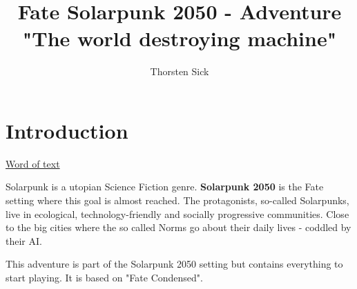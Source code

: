 \documentclass{book}
\title{Fate Solarpunk 2050 - Adventure "The world destroying machine"}
\author{Thorsten Sick}
\begin{document}
\chapter{Introduction}

\hyperref[sec:hello]{Word of text}

Solarpunk is a utopian Science Fiction genre. \textbf{Solarpunk 2050} is the Fate setting where this goal is almost reached. The protagonists, so-called Solarpunks, live in ecological, technology-friendly and socially progressive communities. Close to the big cities where the so called Norms go about their daily lives - coddled by their AI.

This adventure is part of the Solarpunk 2050 setting but contains everything to start playing. It is based on "Fate Condensed".


\end{document}
